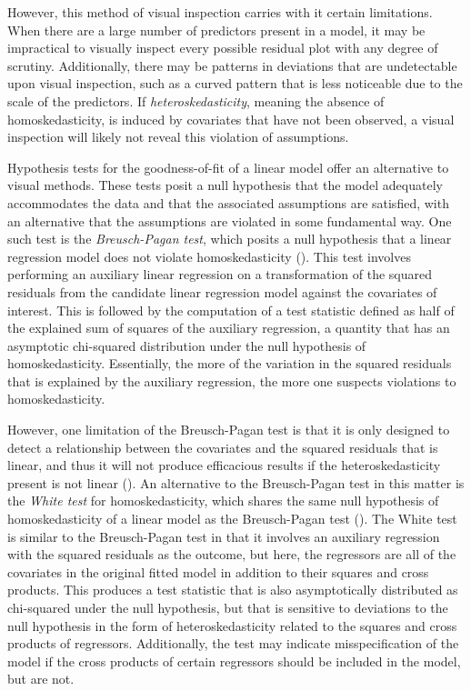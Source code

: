 \documentclass[12pt]{article} %
\theoremstyle{definition}
\begin{document}
		However, this method of visual inspection carries with it certain limitations. When there are a large number of predictors present in a model, it may be impractical to visually inspect every
		possible residual plot with any degree of scrutiny. Additionally, there may be patterns in deviations that are undetectable upon visual inspection, such as a curved pattern that is less noticeable
		due to the scale of the predictors. If \textit{heteroskedasticity}, meaning the absence of homoskedasticity, is induced by covariates that have not been observed, a visual inspection will likely
		not reveal this violation of assumptions.

		Hypothesis tests for the goodness-of-fit of a linear model offer an alternative to visual methods. These tests posit a null hypothesis that the model adequately accommodates the data and that
		the associated assumptions are satisfied, with an alternative that the assumptions are violated in some fundamental way. One such test is the \textit{Breusch-Pagan test}, which posits a null hypothesis
		that a linear regression model does not violate homoskedasticity (\cite{Breusch}). This test involves performing an auxiliary linear regression on a transformation of the squared residuals from
		the candidate linear regression model against the covariates of interest. This is followed by the computation of a test statistic defined as half of the explained sum of squares of the auxiliary
		regression, a quantity that has an asymptotic chi-squared distribution under the null hypothesis of homoskedasticity. Essentially, the more of the variation in the squared residuals that is explained
		by the auxiliary regression, the more one suspects violations to homoskedasticity.

		However, one limitation of the Breusch-Pagan test is that it is only designed to detect a relationship between the covariates and the squared residuals that is linear, and thus it will not
		produce efficacious results if the heteroskedasticity present is not linear (\cite{Waldman}). An alternative to the Breusch-Pagan test in this matter is the \textit{White test} for homoskedasticity,
		which shares the same null hypothesis of homoskedasticity of a linear model as the Breusch-Pagan test (\cite{White1980}). The White test is similar to the Breusch-Pagan test in that it involves
		an auxiliary regression with the squared residuals as the outcome, but here, the regressors are all of the covariates in the original fitted model in addition to their squares and cross
		products. This produces a test statistic that is also asymptotically distributed as chi-squared under the null hypothesis, but that is sensitive to deviations to the null hypothesis in the form of
		heteroskedasticity related to the squares and cross products of regressors. Additionally, the test may indicate misspecification of the model if the cross products of certain
		regressors should be included in the model, but are not.
\end{document}
